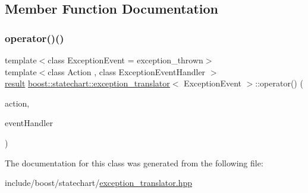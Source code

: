 \subsection{Member Function Documentation}
\mbox{\label{classboost_1_1statechart_1_1exception__translator_a63746f3c872bed0ac70524977ea8644f}} 
\subsubsection{\texorpdfstring{operator()()}{operator()()}}
{\footnotesize\ttfamily template$<$class Exception\+Event = exception\+\_\+thrown$>$ \\
template$<$class Action , class Exception\+Event\+Handler $>$ \\
\mbox{\hyperlink{namespaceboost_1_1statechart_abe807f6598b614d6d87bb951ecd92331}{result}} \mbox{\hyperlink{classboost_1_1statechart_1_1exception__translator}{boost\+::statechart\+::exception\+\_\+translator}}$<$ Exception\+Event $>$\+::operator() (\begin{DoxyParamCaption}\item[{\mbox{\hyperlink{_transition_test_8cpp_a0702b01a6272fb248401c96dd3528cec}{Action}}}]{action,  }\item[{Exception\+Event\+Handler}]{event\+Handler }\end{DoxyParamCaption})\hspace{0.3cm}{\ttfamily [inline]}}



The documentation for this class was generated from the following file\+:\begin{DoxyCompactItemize}
\item 
include/boost/statechart/\mbox{\hyperlink{exception__translator_8hpp}{exception\+\_\+translator.\+hpp}}\end{DoxyCompactItemize}
